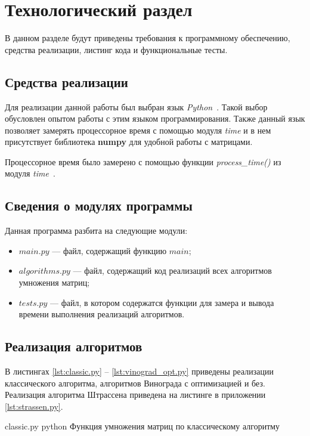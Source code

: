 \chapter{Технологический раздел}

В данном разделе будут приведены требования к программному обеспечению, средства реализации, листинг кода и функциональные тесты.

\section{Средства реализации}

Для реализации данной работы был выбран язык \textit{Python}~\cite{python}.
Такой выбор обусловлен опытом работы с этим языком программирования.
Также данный язык позволяет замерять процессорное время с помощью модуля \textit{time} и в нем присутствует библиотека \textbf{numpy} для удобной работы с матрицами. 

Процессорное время было замерено с помощью функции \textit{process\_time()} из модуля \textit{time}~\cite{python-time}.

\section{Сведения о модулях программы}

Данная программа разбита на следующие модули:
\begin{itemize}
	\item $main.py$ --- файл, содержащий функцию $main$;
	\item $algorithms.py$ --- файл, содержащий код реализаций всех алгоритмов умножения матриц;
	\item $tests.py$ --- файл, в котором содержатся функции для замера и вывода времени выполнения реализаций алгоритмов.
\end{itemize}

\section{Реализация алгоритмов}

В листингах \ref{lst:classic.py} -- \ref{lst:vinograd_opt.py} приведены реализации классического алгоритма, алгоритмов Винограда с оптимизацией и без. Реализация алгоритма Штрассена приведена на листинге в приложении \ref{lst:strassen.py}.


\clearpage

{classic.py} %
{python} %
{Функция умножения матриц по классическому алгоритму} %

